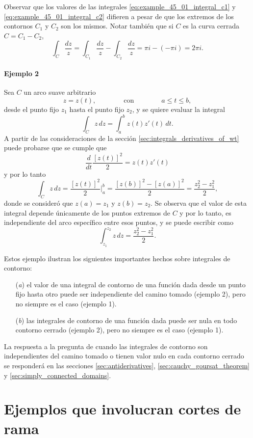 \documentclass[a4paper]{report}
\begin{document}
Observar que los valores de las integrales \ref{eq:example_45_01_integral_c1} y \ref{eq:example_45_01_integral_c2} difieren a pesar de que los extremos de los contornos \(C_1\) y \(C_2\) son los mismos. Notar también que si \(C\) es la curva cerrada \(C=C_1-C_2\),
\[
 \int_C\frac{dz}{z}=\int_{C_1}\frac{dz}{z}-\int_{C_2}\frac{dz}{z}=\pi i-(-\pi i)=2\pi i.
\]

\paragraph{Ejemplo 2} Sea \(C\) un arco suave arbitrario
\[
 z=z(t),\qquad\qquad\textrm{con}\qquad\qquad a\leq t\leq b,
\]
desde el punto fijo \(z_1\) hasta el punto fijo \(z_2\), y se quiere evaluar la integral
\[
 \int_C z\,dz=\int_a^bz(t)z'(t)\,dt.
\]
A partir de las consideraciones de la sección \ref{sec:integrals_derivatives_of_wt} puede probarse que se cumple que 
\[
 \frac{d}{dt}\frac{[z(t)]^2}{2}=z(t)z'(t)
\]
y por lo tanto
\[
 \int_C z\,dz=\frac{[z(t)]^2}{2}\bigg|_a^b=\frac{[z(b)]^2-[z(a)]^2}{2}=\frac{z_2^2-z_1^2}{2},
\]
donde se consideró que \(z(a)=z_1\) y \(z(b)=z_2\). Se observa que el valor de esta integral depende únicamente de los puntos extremos de \(C\) y por lo tanto, es independiente del arco específico entre esos puntos, y se puede escribir como
\[
 \int_{z_1}^{z_2}z\,dz=\frac{z_2^2-z_1^2}{2}.
\]

Estos ejemplo ilustran los siguientes importantes hechos sobre integrales de contorno:
\begin{enumerate}
 \item[(\textit{a})] el valor de una integral de contorno de una función dada desde un punto fijo hasta otro puede ser independiente del camino tomado (ejemplo 2), pero no siempre es el caso (ejemplo 1).
 \item[(\textit{b})] las integrales de contorno de una función dada puede ser nula en todo contorno cerrado (ejemplo 2), pero no siempre es el caso (ejemplo 1).
\end{enumerate}

La respuesta a la pregunta de cuando las integrales de contorno son independientes del camino tomado o tienen valor nulo en cada contorno cerrado se responderá en las secciones \ref{sec:antiderivatives}, \ref{sec:cauchy_goursat_theorem} y \ref{sec:simply_connected_domains}. 

\section{Ejemplos que involucran cortes de rama}\label{sec:integrals_examples_with_branch_cuts}
\end{document}
